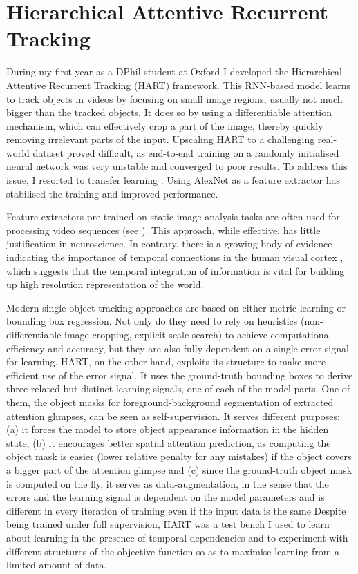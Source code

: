 \section{Hierarchical Attentive Recurrent Tracking}
\label{sec:done}

    During my first year as a DPhil student at Oxford I developed the Hierarchical Attentive Recurrent Tracking (HART) framework. This RNN-based model learns to track objects in videos by focusing on small image regions, usually not much bigger than the tracked objects. It does so by using a differentiable attention mechanism, which can effectively crop a part of the image, thereby quickly removing irrelevant parts of the input.
    Upscaling HART to a challenging real-world dataset proved difficult, as end-to-end training on a randomly initialised neural network was very unstable and converged to poor results. To address this issue, I resorted to transfer learning \citep{Pan2010}. Using AlexNet \citep{Krizhevsky2012} as a feature extractor has stabilised the training and improved performance.
    
    Feature extractors pre-trained on static image analysis tasks are often used for processing video sequences (see \eg \cite{Ning2016a}). This approach, while effective, has little justification in neuroscience. In contrary, there is a growing body of evidence indicating the importance of temporal connections in the human visual cortex \citep{Ungerleider2000}, which suggests that the temporal integration of information is vital for building up high resolution representation of the world.   
    
    Modern single-object-tracking approaches are based on either metric learning or bounding box regression. Not only do they need to rely on heuristics (non-differentiable image cropping, explicit scale search) to achieve computational efficiency and accuracy, but they are also fully dependent on a single error signal for learning.
    HART, on the other hand, exploits its structure to make more efficient use of the error signal. It uses the ground-truth bounding boxes to derive three related but distinct learning signals, one of each of the model parts. One of them, the object masks for foreground-background segmentation of extracted attention glimpses, can be seen as self-supervision.
    It serves different purposes: (a) it forces the model to store object appearance information in the hidden state, (b) it encourages better spatial attention prediction, as computing the object mask is easier (lower relative penalty for any mistakes) if the object covers a bigger part of the attention glimpse and (c) since the ground-truth object mask is computed on the fly, it serves as data-augmentation, in the sense that the errors and the learning signal is dependent on the model parameters and is different in every iteration of training even if the input data is the same
    Despite being trained under full supervision, HART was a test bench I used to learn about learning in the presence of temporal dependencies and to experiment  with different structures of the objective function so as to maximise learning from a limited amount of data.